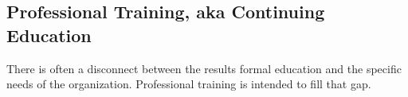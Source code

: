\subsection{Professional Training, aka Continuing Education}

There is often a disconnect between the results formal education and the specific needs of the organization. Professional training is intended to fill that gap.  